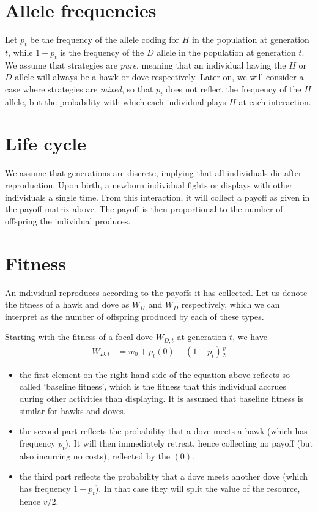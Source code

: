 \documentclass[
]{book}
\providecommand{\tightlist}{%
  \setlength{\itemsep}{0pt}\setlength{\parskip}{0pt}}
\begin{document}
\hypertarget{allele-frequencies}{%
\section{Allele frequencies}\label{allele-frequencies}}

Let \(p_{t}\) be the frequency of the allele coding for \(H\) in the population at generation \(t\), while \(1-p_{t}\) is the frequency of the \(D\) allele in the population at generation \(t\). We assume that strategies are \emph{pure}, meaning that an individual having the \(H\) or \(D\) allele will always be a hawk or dove respectively. Later on, we will consider a case where strategies are \emph{mixed}, so that \(p_{t}\) does not reflect the frequency of the \(H\) allele, but the probability with which each individual plays \(H\) at each interaction.

\hypertarget{life-cycle}{%
\section{Life cycle}\label{life-cycle}}

We assume that generations are discrete, implying that all individuals die after reproduction. Upon birth, a newborn individual fights or displays with other individuals a single time. From this interaction, it will collect a payoff as given in the payoff matrix above. The payoff is then proportional to the number of offspring the individual produces.

\hypertarget{fitness}{%
\section{Fitness}\label{fitness}}

An individual reproduces according to the payoffs it has collected. Let us denote the fitness of a hawk and dove as \(W_{H}\) and \(W_{D}\) respectively, which we can interpret as the number of offspring produced by each of these types.

Starting with the fitness of a focal dove \(W_{D,t}\) at generation \(t\), we have
\begin{align}
W_{D,t} &= w_{0} + p_{t} (0) + \left(1-p_{t} \right) \frac{v}{2}
\end{align}

\begin{itemize}
\tightlist
\item
  the first element on the right-hand side of the equation above reflects so-called `baseline fitness', which is the fitness that this individual accrues during other activities than displaying. It is assumed that baseline fitness is similar for hawks and doves.
\item
  the second part reflects the probability that a dove meets a hawk (which has frequency \(p_{t}\)). It will then immediately retreat, hence collecting no payoff (but also incurring no costs), reflected by the \((0)\).
\item
  the third part reflects the probability that a dove meets another dove (which has frequency \(1-p_{t}\)). In that case they will split the value of the resource, hence \(v/2\).
\end{itemize}
\end{document}
